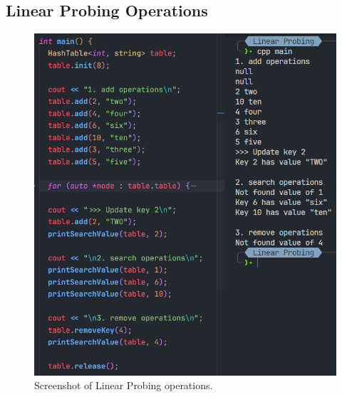 \subsection{Linear Probing Operations}
\begin{figure}[!ht]
	\centering
	\includegraphics[width=\textwidth]{imgs/Linear Probing/operations.png}
	\caption{Screenshot of Linear Probing operations.}\label{fig:linearprobing-operations}
\end{figure}